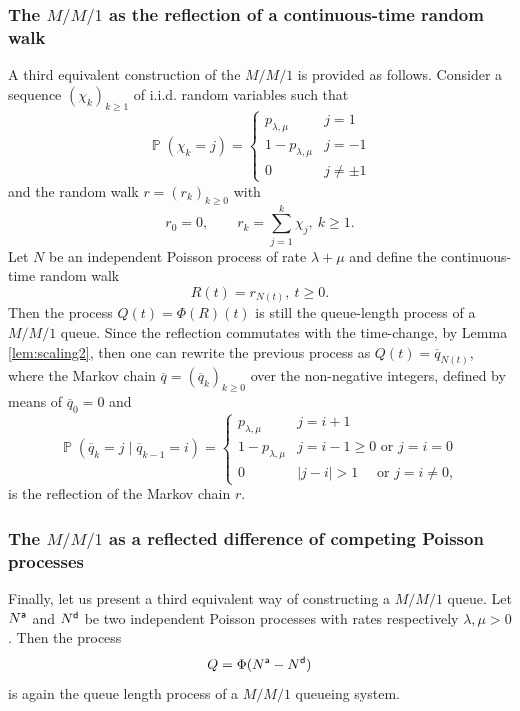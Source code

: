 \documentclass[]{amsart}
\numberwithin{equation}{section}
\theoremstyle{remark}
\theoremstyle{definition}
\DeclareMathOperator{\bP}{\mathbb{P}}
\begin{document}
\subsubsection{The $M/M/1$ as the reflection of a continuous-time random walk}\label{sec:MM1ref}
{A third equivalent construction of the $M/M/1$ is provided as follows. Consider a sequence $(\chi_k)_{k \ge 1}$ of i.i.d. random variables such that
\begin{equation}\label{eq:MCc}
	\bP(\chi_k=j)=\begin{cases} p_{\lambda,\mu} & j=1 \\
		1-p_{\lambda,\mu} & j=-1 \\
		0 & j \not = \pm 1
	\end{cases}
\end{equation}
and the random walk $r=(r_k)_{k \ge 0}$ with
\begin{equation}\label{eq:dtrw}
	r_0=0, \qquad r_k=\sum_{j=1}^{k}\chi_j, \ k \ge 1.
\end{equation}
Let $N$ be an independent Poisson process of rate $\lambda+\mu$ and define the continuous-time random walk
\begin{equation}\label{eq:ctrw}
R(t)=r_{N(t)}, \ t \ge 0.
\end{equation}
Then the process $Q(t)=\Phi(R)(t)$ is still the queue-length process of a $M/M/1$ queue. Since the reflection commutates with the time-change, by Lemma \ref{lem:scaling2}, then one can rewrite the previous process as $Q(t)=\overline{q}_{N(t)}$, where the Markov chain $\overline{q}=(\overline{q}_k)_{k \ge 0}$ over the non-negative integers, defined by means of $\overline{q}_0=0$ and
\begin{equation}\label{eq:Mchain2}
	\bP(\overline{q}_k=j \mid \overline{q}_{k-1}=i)=\begin{cases}
		p_{\lambda,\mu} & j=i+1 \\
		1-p_{\lambda,\mu} & j=i-1 \ge 0 \mbox{ or }j=i=0 \\
		0 & |j-i|>1 \quad \mbox{ or } j=i \not = 0,
	\end{cases}
\end{equation}
is the reflection of the Markov chain $r$.}


\subsubsection{The $M/M/1$ as a reflected difference of competing Poisson processes}\label{sec:comp}
{Finally, let us present a third equivalent way of constructing a $M/M/1$ queue. Let $N^{\sf a}$ and $N^{\sf d}$ be two independent Poisson processes with rates respectively $\lambda,\mu>0$. Then the process
\begin{equation*}
Q=\Phi(N^{\sf a}-N^{\sf d})
\end{equation*}
is again the queue length process of a $M/M/1$ queueing system.}
\end{document}
